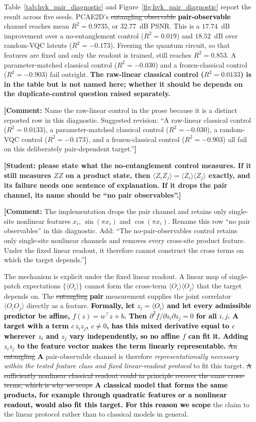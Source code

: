 \documentclass[pdflatex,sn-basic]{sn-jnl}
\newcommand{\del}[1]{\sout{#1}}
\newcommand{\add}[1]{\textbf{\textcolor{black}{#1}}}
\newcommand{\yellowcomment}[1]{%
  \par\smallskip\noindent
  \begingroup\setlength{\fboxsep}{3pt}%
  \colorbox{yellow!35}{\parbox{\dimexpr\linewidth-2\fboxsep\relax}{\textbf{[Comment:} #1\textbf{]}}}%
  \endgroup\par\smallskip}
\begin{document}
Table~\ref{tab:hvk_pair_diagnostic} and Figure~\ref{fig:hvk_pair_diagnostic}
report the result across five seeds. PCAE2D's \del{entangling observable}
\add{pair-observable} channel
reaches mean $R^2=0.9735$, or $32.77$~dB PSNR. This is a $17.74$~dB improvement
over a no-entanglement control ($R^2=0.019$) and $18.52$~dB over random-VQC
latents ($R^2=-0.173$). Freezing the quantum circuit, so that features are fixed
and only the readout is trained, still reaches $R^2=0.853$. A parameter-matched
classical control ($R^2=-0.030$) and a frozen-classical control ($R^2=-0.903$)
fail outright. {\color{red}\textbf{The raw-linear classical control
($R^2=0.0133$) is in the table but is not named here; whether it should be
depends on the duplicate-control question raised separately.}}
\yellowcomment{Name the raw-linear control in the prose because it is a distinct reported row in this diagnostic. Suggested revision: ``A raw-linear classical control ($R^2=0.0133$), a parameter-matched classical control ($R^2=-0.030$), a random-VQC control ($R^2=-0.173$), and a frozen-classical control ($R^2=-0.903$) all fail on this deliberately pair-dependent target.''}

{\color{red}\textbf{[Student: please state what the no-entanglement control
measures. If it still measures $ZZ$ on a product state, then
$\langle Z_iZ_j\rangle=\langle Z_i\rangle\langle Z_j\rangle$ exactly, and its
failure needs one sentence of explanation. If it drops the pair channel, its
name should be ``no pair observables''.]}}
\yellowcomment{The implementation drops the pair channel and retains only single-site nonlinear features $x_i$, $\sin(\pi x_i)$ and $\cos(\pi x_i)$. Rename this row ``no pair observables'' in this diagnostic. Add: ``The no-pair-observables control retains only single-site nonlinear channels and removes every cross-site product feature. Under the fixed linear readout, it therefore cannot construct the cross terms on which the target depends.''}


The mechanism is explicit under the fixed linear readout. A linear map of
single-patch expectations $\{\langle O_i\rangle\}$ cannot form the cross-term
$\langle O_i\rangle\langle O_j\rangle$ that the target depends on. The \del{entangling}
\add{pair} measurement supplies the joint correlator $\langle O_iO_j\rangle$ directly as a
feature. \add{Formally, let $z_i=\langle O_i\rangle$ and let every admissible
predictor be affine, $f(z)=w^{\top}z+b$. Then
$\partial^2 f/\partial z_i\partial z_j=0$ for all $i,j$. A target with a term
$c\,z_iz_j$, $c\neq0$, has this mixed derivative equal to $c$ wherever $z_i$ and
$z_j$ vary independently, so no affine $f$ can fit it. Adding $z_iz_j$ to the
feature vector makes the term linearly representable.} \del{An entangling}
\add{A} pair-observable channel is therefore
\emph{representationally necessary within the tested feature class and fixed
linear-readout protocol} to fit this target. \del{A sufficiently nonlinear classical
readout could in principle recover the same cross-terms, which is why we scope}
\add{A classical model that forms the same products, for example through
quadratic features or a nonlinear readout, would also fit this target. For this
reason we scope} the claim to the linear protocol rather than to classical models in general.
\end{document}
